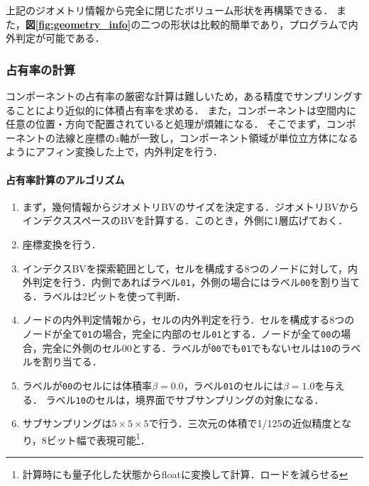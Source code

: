 上記のジオメトリ情報から完全に閉じたボリューム形状を再構築できる．
また，\textbf{図\ref{fig:geometry_info}}の二つの形状は比較的簡単であり，プログラムで内外判定が可能である．

%
\subsubsection{占有率の計算}
コンポーネントの占有率の厳密な計算は難しいため，ある精度でサンプリングすることにより近似的に体積占有率を求める．
また，コンポーネントは空間内に任意の位置・方向で配置されていると処理が煩雑になる．
そこでまず，コンポーネントの法線と座標の$z$軸が一致し，コンポーネント領域が単位立方体になるようにアフィン変換した上で，内外判定を行う．

\paragraph{占有率計算のアルゴリズム}

\begin{enumerate}
\item まず，幾何情報からジオメトリBVのサイズを決定する．ジオメトリBVからインデクススペースのBVを計算する．このとき，外側に1層広げておく．
\item 座標変換を行う．
\item インデクスBVを探索範囲として，セルを構成する8つのノードに対して，内外判定を行う．内側であればラベル\verb|01|，外側の場合にはラベル\verb|00|を割り当てる．ラベルは2ビットを使って判断．
\item ノードの内外判定情報から，セルの内外判定を行う．セルを構成する8つのノードが全て\verb|01|の場合，完全に内部のセル\verb|01|とする．ノードが全て\verb|00|の場合，完全に外側のセル00とする．ラベルが\verb|00|でも\verb|01|でもないセルは\verb|10|のラベルを割り当てる．
\item ラベルが\verb|00|のセルには体積率$\beta=0.0$，ラベル\verb|01|のセルには$\beta=1.0$を与える．
ラベル\verb|10|のセルは，境界面でサブサンプリングの対象になる．
\item サブサンプリングは$5\times5\times5$で行う．三次元の体積で1/125の近似精度となり，8ビット幅で表現可能\footnote{計算時にも量子化した状態からfloatに変換して計算．ロードを減らせる}．
\end{enumerate}

